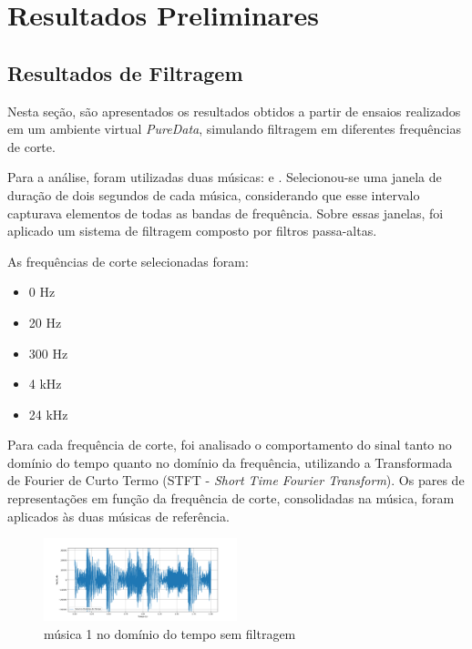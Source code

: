 \chapter[Resultados Preliminares]{Resultados Preliminares}
\label{sec:Resultados}

\section{Resultados de Filtragem}

Nesta seção, são apresentados os resultados obtidos a partir de ensaios realizados em um ambiente virtual \textit{PureData}, simulando filtragem em diferentes frequências de corte.

Para a análise, foram utilizadas duas músicas: \cite{track01} e \cite{track02}. Selecionou-se uma janela de duração de dois segundos de cada música, considerando que esse intervalo capturava elementos de todas as bandas de frequência. Sobre essas janelas, foi aplicado um sistema de filtragem composto por filtros passa-altas.

As frequências de corte selecionadas foram:

\begin{itemize}
    \item 0 Hz
    \item 20 Hz
    \item 300 Hz
    \item 4 kHz
    \item 24 kHz
\end{itemize}

Para cada frequência de corte, foi analisado o comportamento do sinal tanto no domínio do tempo quanto no domínio da frequência, utilizando a Transformada de Fourier de Curto Termo (STFT - \textit{Short Time Fourier Transform}). Os pares de representações em função da frequência de corte, consolidadas na música, foram aplicados às duas músicas de referência.

\begin{figure}[h]
	\centering
    \includegraphics[width=0.5\textwidth]{figuras/fig40.png}
	\caption{música 1 no domínio do tempo sem filtragem}
	\label{fig40}
\end{figure}

